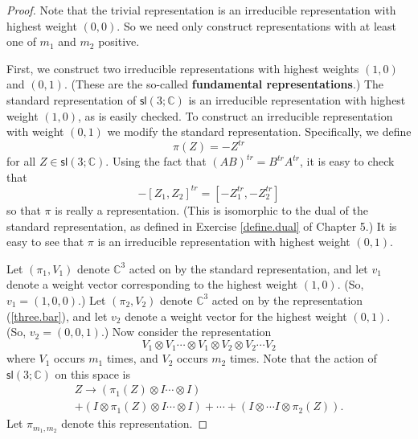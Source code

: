 \documentclass{amsbook}
\theoremstyle{plain}
\numberwithin{equation}{chapter}
\numberwithin{theorem}{chapter}
\begin{document}
\begin{proof}
Note that the trivial representation is an irreducible representation with
highest weight $\left(  0,0\right)  $. So we need only construct
representations with at least one of $m_{1}$ and $m_{2}$ positive.

First, we construct two irreducible representations with highest weights
$\left(  1,0\right)  $ and $\left(  0,1\right)  $. (These are the so-called
\textbf{fundamental representations}.) The standard representation of
$\mathsf{sl}\left(  3;\mathbb{C}\right)  $ is an irreducible representation
with highest weight $\left(  1,0\right)  $, as is easily checked. To construct
an irreducible representation with weight $\left(  0,1\right)  $ we modify the
standard representation. Specifically, we define
\begin{equation}
\pi(Z)=-Z^{tr}\label{three.bar}%
\end{equation}
for all $Z\in\mathsf{sl}\left(  3;\mathbb{C}\right)  $. Using the fact that
$\left(  AB\right)  ^{tr}=B^{tr}A^{tr}$, it is easy to check that
\[
-\left[  Z_{1},Z_{2}\right]  ^{tr}=\left[  -Z_{1}^{tr},-Z_{2}^{tr}\right]
\]
so that $\pi$ is really a representation. (This is isomorphic to the dual of
the standard representation, as defined in Exercise \ref{define.dual} of
Chapter 5.) It is easy to see that $\pi$ is an irreducible representation with
highest weight $\left(  0,1\right)  $.

Let $\left(  \pi_{1},V_{1}\right)  $ denote $\mathbb{C}^{3}$ acted on by the
standard representation, and let $v_{1}$ denote a weight vector corresponding
to the highest weight $\left(  1,0\right)  $. (So, $v_{1}=(1,0,0)$.) Let
$\left(  \pi_{2},V_{2}\right)  $ denote $\mathbb{C}^{3}$ acted on by the
representation (\ref{three.bar}), and let $v_{2}$ denote a weight vector for
the highest weight $\left(  0,1\right)  $. (So, $v_{2}=(0,0,1)$.) Now consider
the representation
\[
V_{1}\otimes V_{1}\cdots\otimes V_{1}\otimes V_{2}\otimes V_{2}\cdots V_{2}%
\]
where $V_{1}$ occurs $m_{1}$ times, and $V_{2}$ occurs $m_{2}$ times. Note
that the action of $\mathsf{sl}\left(  3;\mathbb{C}\right)  $ on this space
is
\begin{align}
Z\rightarrow\left(  \pi_{1}(Z)\otimes I\cdots\otimes I\right)  \nonumber\\
+\left(  I\otimes\pi_{1}(Z)\otimes I\cdots\otimes I\right)  +\cdots+\left(
I\otimes\cdots I\otimes\pi_{2}(Z)\right)  \text{.}\label{tensor.n.m}%
\end{align}
Let $\pi_{m_{1},m_{2}}$ denote this representation.


\end{proof}
\end{document}
